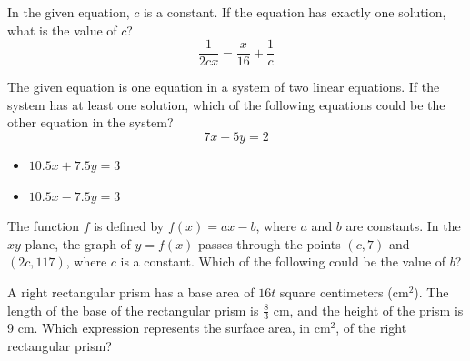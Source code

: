 \vspace{2em}
\newpage

\noindent\markforreview
\vspace{1em}

In the given equation, \(c\) is a constant.
If the equation has exactly one solution, what is the value of \(c\)?
\[
\frac{1}{2cx} = \frac{x}{16} + \frac{1}{c}
\]

\vspace{2em}
\newpage

\noindent\markforreview
\vspace{1em}

The given equation is one equation in a system of two linear equations.
If the system has at least one solution, which of the following equations could be the other equation in the system?
\[
7x + 5y = 2
\]

\begin{itemize}
\item[I] \(10.5x + 7.5y = 3\)
\item[II] \(10.5x - 7.5y = 3\)
\end{itemize}

\vspace{0.75em}


\vspace{2em}
\newpage

\noindent\markforreview
\vspace{1em}

The function \(f\) is defined by \(f(x) = ax - b\), where \(a\) and \(b\) are constants.
In the \(xy\)-plane, the graph of \(y = f(x)\) passes through the points \((c, 7)\) and \((2c, 117)\), where \(c\) is a constant.
Which of the following could be the value of \(b\)?

\vspace{2em}
\newpage

\noindent\markforreview
\vspace{1em}

A right rectangular prism has a base area of \(16t\) square centimeters (\(\text{cm}^2\)).
The length of the base of the rectangular prism is \(\frac{8}{3}\) cm, and the height of the prism is 9 cm.
Which expression represents the surface area, in \(\text{cm}^2\), of the right rectangular prism?

\vspace{2em}
\newpage

